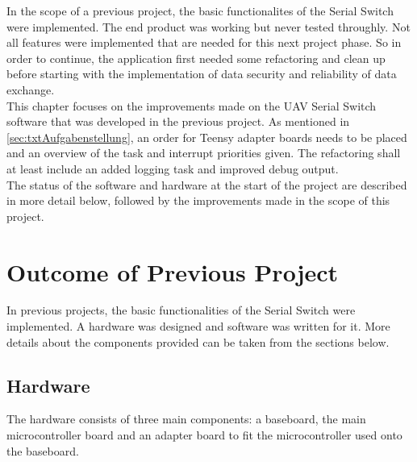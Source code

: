 %
In the scope of a previous project, the basic functionalites of the Serial Switch were implemented. The end product was working but never tested throughly. Not all features were implemented that are needed for this next project phase. So in order to continue, the application first needed some refactoring and clean up before starting with the implementation of data security and reliability of data exchange.\\
This chapter focuses on the improvements made on the UAV Serial Switch software that was developed in the previous project. As mentioned in \autoref{sec:txtAufgabenstellung}, an order for Teensy adapter boards needs to be placed and an overview of the task and interrupt priorities given. The refactoring shall at least include an added logging task and improved debug output.\\
The status of the software and hardware at the start of the project are described in more detail below, followed by the improvements made in the scope of this project.
%
%
\section{Outcome of Previous Project}
In previous projects, the basic functionalities of the Serial Switch were implemented. A hardware was designed and software was written for it. More details about the components provided can be taken from the sections below.
%
\subsection{Hardware}
The hardware consists of three main components: a baseboard, the main microcontroller board and an adapter board to fit the microcontroller used onto the baseboard.
%
